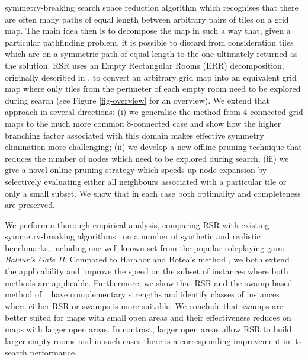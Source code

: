 symmetry-breaking search space reduction algorithm which recognises 
that there are often many paths of equal length between arbitrary pairs of tiles on a 
grid map.
The main idea then is to decompose the map in such a way that, 
given a particular pathfinding problem, it is possible to discard from consideration tiles which are on 
a symmetric path of equal length to the one ultimately returned as the solution.
RSR uses an Empty Rectangular Rooms (ERR) decomposition, originally described in
\cite{harabor10}, to convert an arbitrary grid map into an equivalent grid map where only tiles from the 
perimeter of each empty room need to be explored during search (see Figure
\ref{fig-overview} for an overview).
We extend that approach in several directions: (i) we generalise the method from 4-connected grid maps to 
the much more common 8-connected case and show how the higher branching factor associated 
with this domain makes effective symmetry elimination more challenging;
(ii) we develop a new offline pruning technique that reduces the number of nodes which
need to be explored during search;
(iii) we give a novel online pruning strategy which speeds up node expansion by selectively 
evaluating either all neighbours associated with a particular tile or only a small subset.
We show that in each case both optimality and completeness are preserved.
\par
We perform a thorough empirical analysis, comparing RSR with existing
symmetry-breaking algorithms~\cite{pochter10,harabor10}
on a number of synthetic and realistic benchmarks, including one well known set 
from the popular roleplaying game \emph{Baldur's Gate II}.
Compared to Harabor and Botea's method , 
we both extend the applicability and improve the speed
on the subset of instances where both methods are applicable.
Furthermore, we show that RSR and the swamp-based method of 
\citeauthor{pochter10}~
have complementary strengths and identify classes of instances where
either RSR or swamps is more suitable.
We conclude that swamps are better suited for maps with
small open areas and their effectiveness reduces on maps with larger open areas.
In contrast, larger open areas allow RSR to build larger empty rooms and in such
cases there is a corresponding improvement in its search performance.


